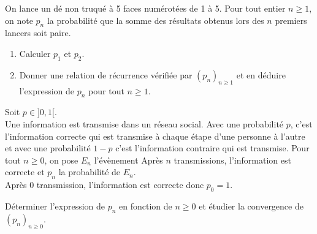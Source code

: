 \documentclass[a4paper,10pt]{report}
\begin{document}
\begin{Exa} On lance un dé non truqué à 5 faces numérotées de 1 à 5. Pour tout entier $n \geq 1$, on note $p_n$ la probabilité que la somme des résultats obtenus lors des $n$ premiers lancers soit paire. 
\begin{enumerate}
\item Calculer $p_1$ et $p_2$.
\item Donner une relation de récurrence vérifiée par $(p_n)_{n \geq 1}$ et en déduire l'expression de $p_n$ pour tout $n \geq 1$.
\end{enumerate}
\end{Exa}


\begin{Exa} Soit $p \in ]0,1[$. \\
Une information est transmise dans un réseau social. Avec une probabilité $p$, c'est l'information correcte qui est transmise à chaque étape d'une personne à l'autre et avec une probabilité $1-p$ c'est l'information contraire qui est transmise. Pour tout $n \geq 0$, on pose $E_n$ l'évènement \og Après $n$ transmissions, l'information est correcte \fg et $p_n$ la probabilité de $E_n$. \\
\noindent Après 0 transmission, l'information est correcte donc $p_0=1$.

\medskip Déterminer l'expression de $p_n$ en fonction de $n \geq 0$ et étudier la convergence de $(p_n)_{n \geq 0}$.
\end{Exa}
\end{document}

